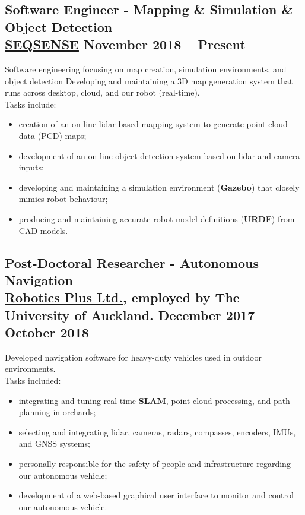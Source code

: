 \documentclass[english]{extarticle}
\begin{document}
\subsection*{Software Engineer - Mapping \& Simulation \& Object Detection \\\textmd{\footnotesize \href{https://www.seqsense.com/}{SEQSENSE} \hfill{} \textbf{November 2018 -- Present}}}
Software engineering focusing on map creation, simulation environments, and object detection
Developing and maintaining a 3D map generation system that runs across desktop, cloud, and our robot (real-time).
\\Tasks include:
\begin{itemize}
    \item creation of an on-line lidar-based mapping system to generate point-cloud-data (PCD) maps;
    \item development of an on-line object detection system based on lidar and camera inputs;
    \item developing and maintaining a simulation environment (\textbf{Gazebo}) that closely mimics robot behaviour;
    \item producing and maintaining accurate robot model definitions (\textbf{URDF}) from CAD models.
\end{itemize}

\subsection*{Post-Doctoral Researcher - Autonomous Navigation\\\textmd{\footnotesize \href{https://www.roboticsplus.co.nz/}{Robotics Plus Ltd.}, employed by The University of Auckland. \hfill{} \textbf{December 2017 -- October 2018}}}
Developed navigation software for heavy-duty vehicles used in outdoor environments.
\\Tasks included:
\begin{itemize}
    \item integrating and tuning real-time \textbf{SLAM}, point-cloud processing, and path-planning in orchards;
    \item selecting and integrating lidar, cameras, radars, compasses, encoders, IMUs, and GNSS systems;
    \item personally responsible for the safety of people and infrastructure regarding our autonomous vehicle;
    \item development of a web-based graphical user interface to monitor and control our autonomous vehicle.
\end{itemize}
\end{document}
